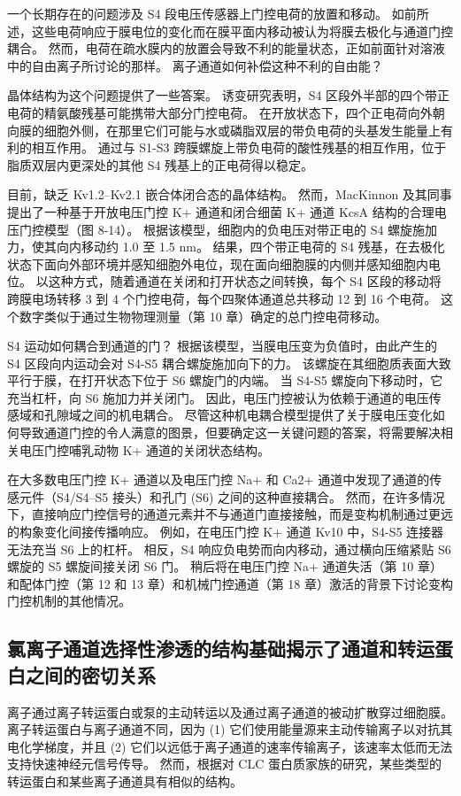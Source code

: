 一个长期存在的问题涉及 S4 段电压传感器上门控电荷的放置和移动。 如前所述，这些电荷响应于膜电位的变化而在膜平面内移动被认为将膜去极化与通道门控耦合。 然而，电荷在疏水膜内的放置会导致不利的能量状态，正如前面针对溶液中的自由离子所讨论的那样。 离子通道如何补偿这种不利的自由能？

晶体结构为这个问题提供了一些答案。 诱变研究表明，S4 区段外半部的四个带正电荷的精氨酸残基可能携带大部分门控电荷。 在开放状态下，四个正电荷向外朝向膜的细胞外侧，在那里它们可能与水或磷脂双层的带负电荷的头基发生能量上有利的相互作用。 通过与 S1-S3 跨膜螺旋上带负电荷的酸性残基的相互作用，位于脂质双层内更深处的其他 S4 残基上的正电荷得以稳定。

目前，缺乏 Kv1.2–Kv2.1 嵌合体闭合态的晶体结构。 然而，MacKinnon 及其同事提出了一种基于开放电压门控 K+ 通道和闭合细菌 K+ 通道 KcsA 结构的合理电压门控模型（图 8-14）。 根据该模型，细胞内的负电压对带正电的 S4 螺旋施加力，使其向内移动约 1.0 至 1.5 nm。 结果，四个带正电荷的 S4 残基，在去极化状态下面向外部环境并感知细胞外电位，现在面向细胞膜的内侧并感知细胞内电位。 以这种方式，随着通道在关闭和打开状态之间转换，每个 S4 区段的移动将跨膜电场转移 3 到 4 个门控电荷，每个四聚体通道总共移动 12 到 16 个电荷。 这个数字类似于通过生物物理测量（第 10 章）确定的总门控电荷移动。

S4 运动如何耦合到通道的门？ 根据该模型，当膜电压变为负值时，由此产生的 S4 区段向内运动会对 S4-S5 耦合螺旋施加向下的力。 该螺旋在其细胞质表面大致平行于膜，在打开状态下位于 S6 螺旋门的内端。 当 S4-S5 螺旋向下移动时，它充当杠杆，向 S6 施加力并关闭门。 因此，电压门控被认为依赖于通道的电压传感域和孔隙域之间的机电耦合。 尽管这种机电耦合模型提供了关于膜电压变化如何导致通道门控的令人满意的图景，但要确定这一关键问题的答案，将需要解决相关电压门控哺乳动物 K+ 通道的关闭状态结构。

在大多数电压门控 K+ 通道以及电压门控 Na+ 和 Ca2+ 通道中发现了通道的传感元件（S4/S4–S5 接头）和孔门 (S6) 之间的这种直接耦合。 然而，在许多情况下，直接响应门控信号的通道元素并不与通道门直接接触，而是变构机制通过更远的构象变化间接传播响应。 例如，在电压门控 K+ 通道 Kv10 中，S4-S5 连接器无法充当 S6 上的杠杆。 相反，S4 响应负电势而向内移动，通过横向压缩紧贴 S6 螺旋的 S5 螺旋间接关闭 S6 门。 稍后将在电压门控 Na+ 通道失活（第 10 章）和配体门控（第 12 和 13 章）和机械门控通道（第 18 章）激活的背景下讨论变构门控机制的其他情况。

\subsection{氯离子通道选择性渗透的结构基础揭示了通道和转运蛋白之间的密切关系}
离子通过离子转运蛋白或泵的主动转运以及通过离子通道的被动扩散穿过细胞膜。 离子转运蛋白与离子通道不同，因为 (1) 它们使用能量源来主动传输离子以对抗其电化学梯度，并且 (2) 它们以远低于离子通道的速率传输离子，该速率太低而无法支持快速神经元信号传导。 然而，根据对 CLC 蛋白质家族的研究，某些类型的转运蛋白和某些离子通道具有相似的结构。

